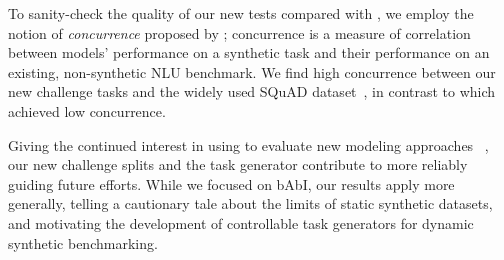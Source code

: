 To sanity-check the quality of our new tests compared with \babibm, we employ the notion of \emph{concurrence} proposed by \citet{liu2021small}; concurrence is a measure of correlation between models' performance on a synthetic task and their performance on an existing, non-synthetic NLU benchmark. We find high concurrence between our new challenge tasks and the widely used SQuAD dataset~\citep{rajpurkar-etal-2016-squad}, in contrast to \babibm which achieved low concurrence. 

Giving the continued interest in using \babibm to evaluate new modeling approaches ~\citep{Banino2020MEMO,banino2021pondernet,schlag2021learning}, our new challenge splits and the \pybabi task generator contribute to more reliably guiding future efforts.
While we focused on bAbI, our results apply more generally, telling a cautionary tale about the limits of static synthetic datasets, and motivating the development of controllable task generators for dynamic synthetic benchmarking.



